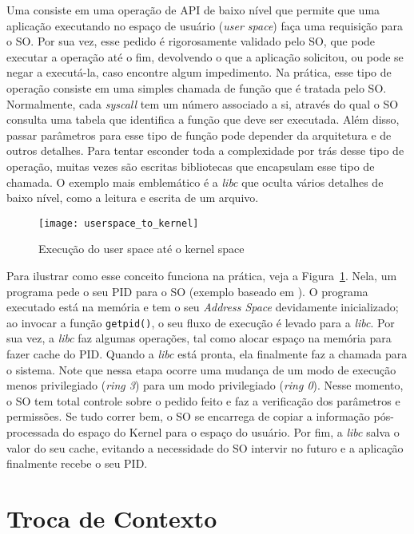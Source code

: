 Uma 
consiste em uma operação de API de baixo nível que permite que uma aplicação executando no
espaço de usuário (\emph{user space}) faça uma requisição para o SO. Por sua
vez, esse pedido é rigorosamente validado pelo SO, que pode executar a operação
até o fim, devolvendo o que a aplicação solicitou, ou pode se negar a
executá-la, caso encontre algum impedimento. Na prática, esse tipo de operação
consiste em uma simples chamada de função que é tratada pelo SO. Normalmente,
cada \emph{syscall} tem um número associado a si, através do qual o SO consulta
uma tabela que identifica a função que deve ser executada. Além disso, passar
parâmetros para esse tipo de função pode depender da arquitetura e de outros
detalhes. Para tentar esconder toda a complexidade por trás desse tipo de
operação, muitas vezes são escritas bibliotecas que encapsulam esse tipo de
chamada. O exemplo mais emblemático é a \emph{libc} que oculta vários detalhes
de baixo nível, como a leitura e escrita de um arquivo.

\begin{figure}[!h]
  \centering
  \texttt{[image: userspace\_to\_kernel]} 
  \caption{Execução do user space até o kernel space}
  \label{fig:userspace_kernelspace}
\end{figure}

Para ilustrar como esse conceito funciona na prática, veja a
Figura~\ref{fig:userspace_kernelspace}. Nela, um programa pede o
seu PID para o SO (exemplo baseado em \cite{syscallex}). O programa executado
está na memória e tem o seu \emph{Address Space} devidamente inicializado;
ao invocar a função \texttt{getpid()}, o seu fluxo de execução é levado para a
\emph{libc}. Por sua vez, a \emph{libc} faz algumas operações, tal como alocar
espaço na memória para fazer cache do PID. Quando a \emph{libc} está pronta,
ela finalmente faz a chamada para o sistema. Note que nessa etapa ocorre uma
mudança de um modo de execução menos privilegiado (\emph{ring 3}) para um modo
privilegiado (\emph{ring 0}). Nesse momento, o SO tem total controle sobre o
pedido feito e faz a verificação dos parâmetros e permissões. Se tudo correr
bem, o SO se encarrega de copiar a informação pós-processada do espaço do
Kernel para o espaço do usuário. Por fim, a \emph{libc} salva o valor do seu
cache, evitando a necessidade do SO intervir no futuro e a aplicação finalmente
recebe o seu PID.

\section{Troca de Contexto}

